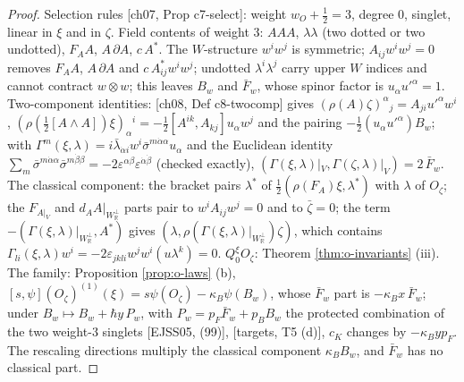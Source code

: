 \begin{proof}
Selection rules [ch07, Prop c7-select]: weight $w_O+\tfrac12=3$, degree $0$, singlet, linear in $\xi$ and in $\zeta$. Field contents of weight $3$: $AAA$, $\lambda\lambda$ (two dotted or two undotted), $F_AA$, $A\,\partial A$, $c\,A^*$. The $W$-structure $w^iw^j$ is symmetric; $A_{ij}w^iw^j=0$ removes $F_AA$, $A\,\partial A$ and $c\,A^*_{ij}w^iw^j$; undotted $\lambda^i\lambda^j$ carry upper $W$ indices and cannot contract $w\otimes w$; this leaves $B_w$ and $\bar F_w$, whose spinor factor is $u_\alpha u'^\alpha=1$. Two-component identities: [ch08, Def c8-twocomp] gives $(\rho(A)\zeta)^\alpha{}_j=A_{ji}u'^\alpha w^i$, $(\rho(\tfrac12[A\wedge A])\xi)_\alpha{}^i=-\tfrac12[A^{ik},A_{kj}]u_\alpha w^j$ and the pairing $-\tfrac12(u_\alpha u'^\alpha)B_w$; with $\Gamma^m(\xi,\lambda)=i\bar\lambda_{\dot\alpha i}w^i\bar\sigma^{m\dot\alpha\alpha}u_\alpha$ and the Euclidean identity $\sum_m\bar\sigma^{m\dot\alpha\alpha}\bar\sigma^{m\dot\beta\beta}=-2\varepsilon^{\alpha\beta}\varepsilon^{\dot\alpha\dot\beta}$ (checked exactly), $(\Gamma(\xi,\lambda)|_V,\Gamma(\zeta,\lambda)|_V)=2\,\bar F_w$. The classical component: the bracket pairs $\lambda^*$ of $\tfrac12(\rho(F_A)\xi,\lambda^*)$ with $\lambda$ of $O_\zeta$; the $F_{A|_V}$ and $d_AA|_{W_{\mathbb R}^\perp}$ parts pair to $w^iA_{ij}w^j=0$ and to $\bar\zeta=0$; the term $-(\Gamma(\xi,\lambda)|_{W_{\mathbb R}^\perp},A^*)$ gives $(\lambda,\rho(\Gamma(\xi,\lambda)|_{W_{\mathbb R}^\perp})\zeta)$, which contains $\Gamma_{li}(\xi,\lambda)w^i=-2\varepsilon_{jkli}w^jw^i(u\lambda^k)=0$. $Q^\xi_0O_\zeta$: Theorem \ref{thm:o-invariants} (iii). The family: Proposition \ref{prop:o-laws} (b), $[s,\psi](O_\zeta)^{(1)}(\xi)=s\psi(O_\zeta)-\kappa_B\psi(B_w)$, whose $\bar F_w$ part is $-\kappa_Bx\,\bar F_w$; under $B_w\mapsto B_w+\hbar y\,P_w$, with $P_w=p_F\bar F_w+p_BB_w$ the protected combination of the two weight-$3$ singlets [EJSS05, (99)], [targets, T5 (d)], $c_K$ changes by $-\kappa_Byp_F$. The rescaling directions multiply the classical component $\kappa_BB_w$, and $\bar F_w$ has no classical part.
\end{proof}

